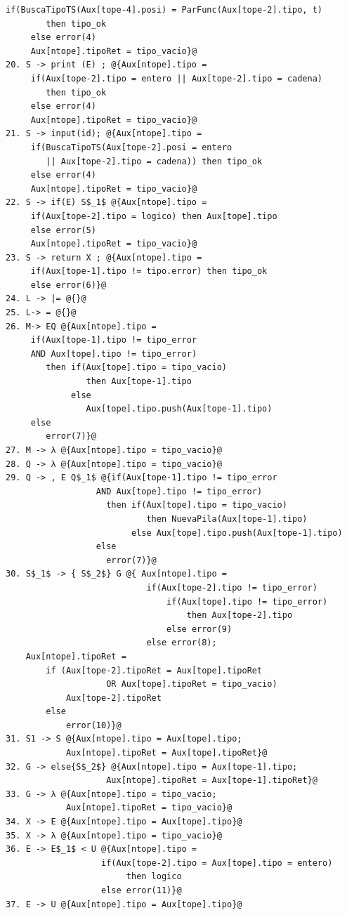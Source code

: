 \documentclass[a4paper, 12pt]{article}
\begin{document}
\begin{lstlisting}[style=EdT]
     if(BuscaTipoTS(Aux[tope-4].posi) = ParFunc(Aux[tope-2].tipo, t)
        then tipo_ok
     else error(4)
     Aux[ntope].tipoRet = tipo_vacio}@
20. S -> print (E) ; @{Aux[ntope].tipo =
     if(Aux[tope-2].tipo = entero || Aux[tope-2].tipo = cadena)
        then tipo_ok
     else error(4)
     Aux[ntope].tipoRet = tipo_vacio}@
21. S -> input(id); @{Aux[ntope].tipo =
     if(BuscaTipoTS(Aux[tope-2].posi = entero
        || Aux[tope-2].tipo = cadena)) then tipo_ok
     else error(4)
     Aux[ntope].tipoRet = tipo_vacio}@
22. S -> if(E) S$_1$ @{Aux[ntope].tipo =
     if(Aux[tope-2].tipo = logico) then Aux[tope].tipo
     else error(5)
     Aux[ntope].tipoRet = tipo_vacio}@
23. S -> return X ; @{Aux[ntope].tipo =
     if(Aux[tope-1].tipo != tipo.error) then tipo_ok
     else error(6)}@
24. L -> |= @{}@
25. L-> = @{}@
26. M-> EQ @{Aux[ntope].tipo =
     if(Aux[tope-1].tipo != tipo_error
     AND Aux[tope].tipo != tipo_error)
        then if(Aux[tope].tipo = tipo_vacio)
                then Aux[tope-1].tipo
             else
                Aux[tope].tipo.push(Aux[tope-1].tipo)
     else
        error(7)}@
27. M -> λ @{Aux[ntope].tipo = tipo_vacio}@
28. Q -> λ @{Aux[ntope].tipo = tipo_vacio}@
29. Q -> , E Q$_1$ @{if(Aux[tope-1].tipo != tipo_error
                  AND Aux[tope].tipo != tipo_error)
                    then if(Aux[tope].tipo = tipo_vacio)
                            then NuevaPila(Aux[tope-1].tipo)
                         else Aux[tope].tipo.push(Aux[tope-1].tipo)
                  else
                    error(7)}@
30. S$_1$ -> { S$_2$} G @{ Aux[ntope].tipo =
                            if(Aux[tope-2].tipo != tipo_error)
                                if(Aux[tope].tipo != tipo_error)
                                    then Aux[tope-2].tipo
                                else error(9)
                            else error(8);
	Aux[ntope].tipoRet =
		if (Aux[tope-2].tipoRet = Aux[tope].tipoRet 
					OR Aux[tope].tipoRet = tipo_vacio)
			Aux[tope-2].tipoRet
		else 
			error(10)}@
31. S1 -> S @{Aux[ntope].tipo = Aux[tope].tipo;
			Aux[ntope].tipoRet = Aux[tope].tipoRet}@
32. G -> else{S$_2$} @{Aux[ntope].tipo = Aux[tope-1].tipo;
					Aux[ntope].tipoRet = Aux[tope-1].tipoRet}@
33. G -> λ @{Aux[ntope].tipo = tipo_vacio;
			Aux[ntope].tipoRet = tipo_vacio}@
34. X -> E @{Aux[ntope].tipo = Aux[tope].tipo}@
35. X -> λ @{Aux[ntope].tipo = tipo_vacio}@
36. E -> E$_1$ < U @{Aux[ntope].tipo =
                   if(Aux[tope-2].tipo = Aux[tope].tipo = entero)
                        then logico
                   else error(11)}@
37. E -> U @{Aux[ntope].tipo = Aux[tope].tipo}@

\end{lstlisting}
\end{document}
